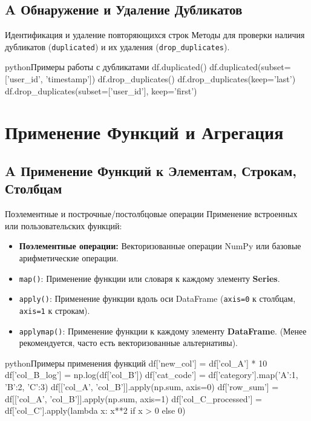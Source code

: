 \subsection{A Обнаружение и Удаление Дубликатов}

\begin{myblock}{Идентификация и удаление повторяющихся строк}
    Методы для проверки наличия дубликатов (\texttt{duplicated}) и их удаления (\texttt{drop\_duplicates}).
    \begin{codebox}{python}{Примеры работы с дубликатами}
    df.duplicated()
    df.duplicated(subset=['user_id', 'timestamp'])
    df.drop_duplicates()
    df.drop_duplicates(keep='last')
    df.drop_duplicates(subset=['user_id'], keep='first')
    \end{codebox}
\end{myblock}

\section{Применение Функций и Агрегация}

\subsection{A Применение Функций к Элементам, Строкам, Столбцам}

\begin{myblock}{Поэлементные и построчные/постолбцовые операции}
    Применение встроенных или пользовательских функций:
    \begin{itemize}[nosep, leftmargin=*]
        \item \textbf{Поэлементные операции:} Векторизованные операции NumPy или базовые арифметические операции.
        \item \texttt{map()}: Применение функции или словаря к каждому элементу \textbf{Series}.
        \item \texttt{apply()}: Применение функции вдоль оси DataFrame (\texttt{axis=0} к столбцам, \texttt{axis=1} к строкам).
        \item \texttt{applymap()}: Применение функции к каждому элементу \textbf{DataFrame}. (Менее рекомендуется, часто есть векторизованные альтернативы).
    \end{itemize}
    \begin{codebox}{python}{Примеры применения функций}
    df['new_col'] = df['col_A'] * 10
    df['col_B_log'] = np.log(df['col_B'])
    df['cat_code'] = df['category'].map({'A':1, 'B':2, 'C':3})
    df[['col_A', 'col_B']].apply(np.sum, axis=0)
    df['row_sum'] = df[['col_A', 'col_B']].apply(np.sum, axis=1)
    df['col_C_processed'] = df['col_C'].apply(lambda x: x**2 if x > 0 else 0)
    \end{codebox}
\end{myblock}

